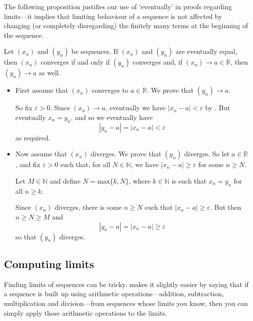 The following proposition justifies our use of `eventually' in proofs regarding limits---it implies that limiting behaviour of a sequence is not affected by changing (or completely disregarding) the finitely many terms at the beginning of the sequence.

\begin{theorem}
Let $(x_n)$ and $(y_n)$ be sequences. If $(x_n)$ and $(y_n)$ are eventually equal, then $(x_n)$ converges if and only if $(y_n)$ converges and, if $(x_n) \to a \in \mathbb{R}$, then $(y_n) \to a$ as well.
\end{theorem}

\begin{cproof}
\fixlistskip
\begin{itemize}
\item First assume that $(x_n)$ converges to $a \in \mathbb{R}$. We prove that $(y_n) \to a$.

So fix $\varepsilon > 0$. Since $(x_n) \to a$, eventually we have $|x_n - a| < \varepsilon$ by . But eventually $x_n = y_n$, and so we eventually have
\[ |y_n - a| = |x_n - a| < \varepsilon \]
as required.

\item Now assume that $(x_n)$ diverges. We prove that $(y_n)$ diverges. So let $a \in \mathbb{R}$, and fix $\varepsilon > 0$ such that, for all $N \in \mathbb{N}$, we have $|x_n - a| \ge \varepsilon$ for some $n \ge N$.

Let $M \in \mathbb{N}$ and define $N = \mathrm{max} \{ k, N \}$, where $k \in \mathbb{N}$ is such that $x_n=y_n$ for all $n \ge k$.

Since $(x_n)$ diverges, there is some $n \ge N$ such that $|x_n - a| \ge \varepsilon$. But then $n \ge N \ge M$ and
\[ |y_n - a| = |x_n - a| \ge \varepsilon \]
so that $(y_n)$ diverges.
\end{itemize}
\end{cproof}

\subsection*{Computing limits}

Finding limits of sequences can be tricky.  makes it slightly easier by saying that if a sequence is built up using arithmetic operations---addition, subtraction, multiplication and division---from sequences whose limits you know, then you can simply apply those arithmetic operations to the limits.

